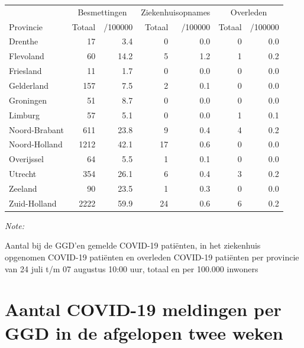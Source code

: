 \documentclass[
  english,
  man,floatsintext]{apa6}
\begin{document}
\begin{table}[H]
\centering
\begin{threeparttable}
\begin{tabular}{lrrrrrr}
\toprule
\multicolumn{1}{c}{ } & \multicolumn{2}{c}{Besmettingen} & \multicolumn{2}{c}{Ziekenhuisopnames} & \multicolumn{2}{c}{Overleden} \\
\cmidrule(l{3pt}r{3pt}){2-3} \cmidrule(l{3pt}r{3pt}){4-5} \cmidrule(l{3pt}r{3pt}){6-7}
Provincie & Totaal & /100000 & Totaal & /100000 & Totaal & /100000\\
\midrule
Drenthe & 17 & 3.4 & 0 & 0.0 & 0 & 0.0\\
Flevoland & 60 & 14.2 & 5 & 1.2 & 1 & 0.2\\
Friesland & 11 & 1.7 & 0 & 0.0 & 0 & 0.0\\
Gelderland & 157 & 7.5 & 2 & 0.1 & 0 & 0.0\\
Groningen & 51 & 8.7 & 0 & 0.0 & 0 & 0.0\\
Limburg & 57 & 5.1 & 0 & 0.0 & 1 & 0.1\\
Noord-Brabant & 611 & 23.8 & 9 & 0.4 & 4 & 0.2\\
Noord-Holland & 1212 & 42.1 & 17 & 0.6 & 0 & 0.0\\
Overijssel & 64 & 5.5 & 1 & 0.1 & 0 & 0.0\\
Utrecht & 354 & 26.1 & 6 & 0.4 & 3 & 0.2\\
Zeeland & 90 & 23.5 & 1 & 0.3 & 0 & 0.0\\
Zuid-Holland & 2222 & 59.9 & 24 & 0.6 & 6 & 0.2\\
\bottomrule
\end{tabular}
\begin{tablenotes}
\item \textit{Note: } 
\item Aantal bij de GGD’en gemelde COVID-19 patiënten, in het ziekenhuis opgenomen COVID-19 patiënten en overleden COVID-19 patiënten per provincie van 24 juli t/m 07 augustus 10:00 uur, totaal en per 100.000 inwoners
\end{tablenotes}
\end{threeparttable}
\end{table}

\newpage

\hypertarget{aantal-covid-19-meldingen-per-ggd-in-de-afgelopen-twee-weken}{%
\section{Aantal COVID-19 meldingen per GGD in de afgelopen twee weken}\label{aantal-covid-19-meldingen-per-ggd-in-de-afgelopen-twee-weken}}
\end{document}
